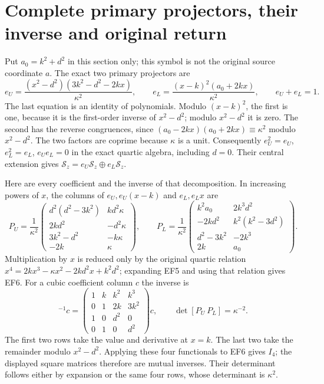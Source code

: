 \documentclass[11pt]{article}
\begin{document}
\section{Complete primary projectors, their inverse and original return}
Put $a_0=k^2+d^2$ in this section only; this symbol is
not the original source coordinate $a$. The exact two
primary projectors are
\begin{equation}
 e_U=\frac{(x^2-d^2)(3k^2-d^2-2kx)}{\kappa^2},\qquad
 e_L=\frac{(x-k)^2(a_0+2kx)}{\kappa^2},\qquad
 e_U+e_L=1.
 \tag{EF5}
\end{equation}
The last equation is an identity of polynomials.
Modulo $(x-k)^2$, the first is one, because it is
the first-order inverse of $x^2-d^2$; modulo
$x^2-d^2$ it is zero. The second has the reverse
congruences, since
$(a_0-2kx)(a_0+2kx)\equiv\kappa^2$ modulo $x^2-d^2$.
The two factors are coprime because $\kappa$ is a unit.
Consequently $e_U^2=e_U$, $e_L^2=e_L$, $e_Ue_L=0$
in the exact quartic algebra, including $d=0$.
Their central extension gives
$\mathscr S_z=e_U\mathscr S_z\oplus e_L\mathscr S_z$.

Here are every coefficient and the inverse of that
decomposition. In increasing powers of $x$, the
columns of $e_U,e_U(x-k)$ and $e_L,e_Lx$ are
\begin{equation}
 P_U=\frac1{\kappa^2}\begin{pmatrix}
 d^2(d^2-3k^2)&kd^2\kappa\\2kd^2&-d^2\kappa\\
 3k^2-d^2&-k\kappa\\-2k&\kappa
 \end{pmatrix},\qquad
 P_L=\frac1{\kappa^2}\begin{pmatrix}
 k^2a_0&2k^3d^2\\-2kd^2&k^2(k^2-3d^2)\\
 d^2-3k^2&-2k^3\\2k&a_0
 \end{pmatrix}.
 \tag{EF6}
\end{equation}
Multiplication by $x$ is reduced only by the original
quartic relation
$x^4=2kx^3-\kappa x^2-2kd^2x+k^2d^2$;
expanding EF5 and using that relation gives EF6.
For a cubic coefficient column $c$ the inverse is
\begin{equation}
 [P_U\ P_L]^{-1}c=
 \begin{pmatrix}1&k&k^2&k^3\\0&1&2k&3k^2\\
 1&0&d^2&0\\0&1&0&d^2\end{pmatrix}c,
 \qquad\det[P_U\ P_L]=\kappa^{-2}.
 \tag{EF7}
\end{equation}
The first two rows take the value and derivative at $x=k$.
The last two take the remainder modulo $x^2-d^2$.
Applying these four functionals to EF6 gives $I_4$;
the displayed square matrices therefore are mutual
inverses. Their determinant follows either by expansion
or the same four rows, whose determinant is $\kappa^2$.
\end{document}
